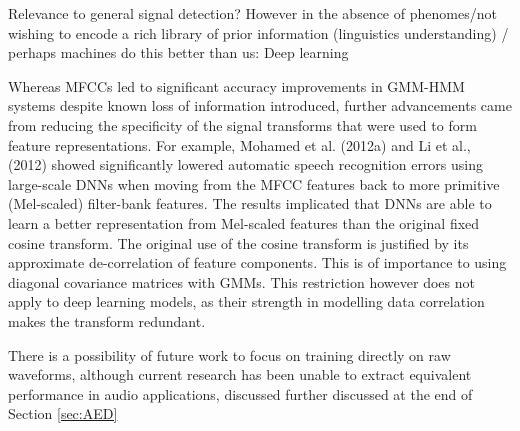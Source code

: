 \documentclass[12pt]{llncs}
\begin{document}

Relevance to general signal detection? However in the absence of phenomes/not wishing to encode a rich library of prior information (linguistics understanding) / perhaps machines do this better than us: Deep learning



Whereas MFCCs led to significant accuracy improvements in GMM-HMM systems despite known loss of information introduced, further advancements came from reducing the specificity of the signal transforms that were used to form feature representations.
For example, Mohamed et al. (2012a) \cite[firstExampleMovingGMMsectionofHMM/GMMtoDNN]{mohamed2012acoustic} and Li et al., (2012) showed significantly lowered automatic speech recognition errors using large-scale DNNs when moving from the MFCC features back to more primitive (Mel-scaled) filter-bank features. The results implicated that DNNs are able to learn a better representation from Mel-scaled features than the original fixed cosine transform. The original use of the cosine transform is justified by its approximate de-correlation of feature components. This is of importance to using diagonal covariance matrices with GMMs. This restriction however does not apply to deep learning models, as their strength in modelling data correlation makes the transform redundant. 

There is a possibility of future work to focus on training directly on raw waveforms, although current research has been unable to extract equivalent performance in audio applications, discussed further discussed at the end of Section \ref{sec:AED}


\end{document}
